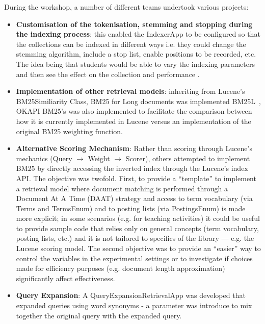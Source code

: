 During the workshop, a number of different teams undertook various projects:
\begin{itemize}
	\item {\bf Customisation of the tokenisation, stemming and stopping during the indexing process}: this enabled the IndexerApp to be configured so that the collections can be indexed in different ways i.e. they could change the stemming algorithm, include a stop list, enable positions to be recorded, etc. The idea being that students would be able to vary the indexing parameters and then see the effect on the collection and performance .
	\item {\bf Implementation of other retrieval models}: inheriting from Lucene's BM25Similiarity Class, BM25 for Long documents was implemented BM25L~\cite{Lv:2011:DVL:2009916.2010070}, OKAPI BM25's was also implemented to facilitate the comparison between how it is currently implemented in Lucene versus an implementation of the original BM25 weighting function.
	\item {\bf Alternative Scoring Mechanism}: Rather than scoring through Lucene's mechanics (Query $\rightarrow$ Weight $\rightarrow$ Scorer), others attempted to implement BM25 by directly accessing the inverted index through the Lucene's index API. The objective was twofold. First, to provide a ``template'' to implement a retrieval model where document matching is performed through a Document At A Time (DAAT) strategy and access to term vocabulary (via Terms and TermsEnum) and to posting lists (via PostingsEnum) is made more explicit; in some scenarios (e.g. for teaching activities) it could be useful to provide sample code that relies only on general concepts (term vocabulary, posting lists, etc.) and it is not tailored to specifics of the library --- e.g. the Lucene scoring model. The second objective was to provide an ``easier'' way to control the variables in the experimental settings or to investigate if choices made for efficiency purposes (e.g. document length approximation) significantly affect effectiveness.
	\item {\bf Query Expansion}: A QueryExpansionRetrievalApp was developed that expanded queries using word synonyms - a parameter was introduce to mix together the original query with the expanded query.

\end{itemize}
